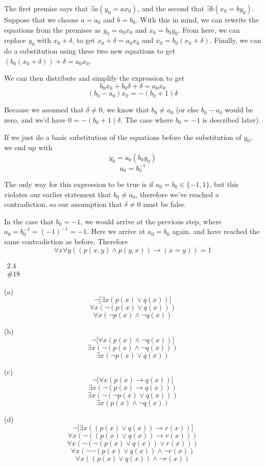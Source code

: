 \documentclass{article}
\newcommand{\T}{1}
\newcommand{\problem}[2]{$\boxed{\begin{array}{l}\text{#1} \\ \text{\##2}\end{array}}$}
\newcommand{\subproblem}[1]{(#1)}
\begin{document}
\begin{multicols*}{2}
The first premise says that $\exists{}a(y_0=ax_0)$, and the second
that $\exists{}b(x_0=by_0)$. Suppose that we choose $a=a_0$ and
$b=b_0$. With this in mind, we can rewrite the equations from the
premises as $y_0=a_0x_0$ and $x_0=b_0y_0$. From here, we can replace
$y_0$ with $x_0+\delta$, to get $x_0+\delta=a_0x_0$ and
$x_0=b_0(x_0+\delta)$. Finally, we can do a substitution using these
two new equations to get $(b_0(x_0+\delta))+\delta=a_0x_0$.

We can then distribute and simplify the expression to get
\[
b_0x_0+b_0\delta+\delta=a_0x_0
\] \[
(b_0-a_0)x_0=-(b_0+1)\delta
\]

Because we assumed that $\delta\ne{}0$, we know that $b_0\ne{}a_0$ (or
else $b_0-a_0$ would be zero, and we'd have $0=-(b_0+1)\delta$. The
case where $b_0=-1$ is described later).

If we just do a basic substitution of the equations before the
substitution of $y_0$, we end up with
\[
y_0=a_0(b_0y_0)
\] \[
a_0=b_0^{-1}
\]

The only way for this expression to be true is if $a_0=b_0\in\{-1,1\}$, but
this violates our earlier statement that $b_0\ne{}a_0$, therefore
we've reached a contradiction, so our assumption that $\delta\ne{}0$
must be false.

In the case that $b_0=-1$, we would arrive at the previous step, where
$a_0=b_0^{-1}=(-1)^{-1}=-1$. Here we arrive at $a_0=b_0$ again, and
have reached the same contradiction as before. Therefore
\[
\forall{}x\forall{}y((p(x,y)\wedge p(y,x))\rightarrow(x=y)) = \boxed{\T}
\]

\problem{2.4}{18}

\subproblem{a} \[
\neg\lbrack\exists x(p(x)\vee q(x))\rbrack
\] \[
\forall x(\neg(p(x)\vee q(x)))
\] \[
\boxed{\forall x(\neg p(x)\wedge\neg q(x))}
\]

\subproblem{b} \[
\neg\lbrack\forall x(p(x)\wedge\neg q(x))\rbrack
\] \[
\exists x(\neg(p(x)\wedge\neg q(x)))
\] \[
\boxed{\exists x(\neg p(x)\vee q(x))}
\]

\subproblem{c} \[
\neg\lbrack\forall x(p(x)\rightarrow q(x))\rbrack
\] \[
\exists x(\neg(p(x)\rightarrow q(x)))
\] \[
\exists x(\neg(\neg p(x)\vee q(x)))
\] \[
\boxed{\exists x(p(x)\wedge\neg q(x))}
\]

\subproblem{d} \[
\neg\lbrack\exists x((p(x)\vee q(x))\rightarrow r(x))\rbrack
\] \[
\forall x(\neg((p(x)\vee q(x))\rightarrow r(x)))
\] \[
\forall x(\neg(\neg(p(x)\vee q(x))\vee r(x)))
\] \[
\forall x(\neg\neg(p(x)\vee q(x))\wedge\neg r(x))
\] \[
\boxed{\forall x((p(x)\vee q(x))\wedge\neg r(x))}
\]


\end{multicols*}
\end{document}
